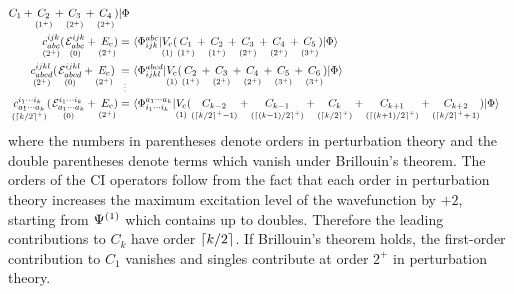 \documentclass[11pt]{article}
\numberwithin{equation}{section}
\begin{document}
\begin{rmk}
\begin{align}
{{      C_1
    }
    +
    \underset{(1^+)}{\vphantom{(}
      C_2
    }
    +
    \underset{(2^+)}{\vphantom{(}
      C_3
    }
    +
    \underset{(2^+)}{\vphantom{(}
      C_4
    }
    )
  |\ensuremath{\Phi }}
\\
  \underset{(2^+)}{\vphantom{(}
  c_{abc}^{ijk}
  }
  (\hspace{1pt}
  \underset{(0)}{\vphantom{(}
    \mathcal{E}_{abc}^{ijk}
  }
  +
  \underset{(2^+)}{\vphantom{(}
    E_{\mathrm{c}}
  }
  \hspace{-2pt}
  )
=&\
  \langle\Phi _{ijk}^{abc}|
  \underset{(1)}{\vphantom{(}
    V_{\mathrm{c}}
  }
    (
    \underset{(1^+)}{\vphantom{(}
      C_1
    }
    +
    \underset{(1^+)}{\vphantom{(}
      C_2
    }
    +
    \underset{(2^+)}{\vphantom{(}
      C_3
    }
    +
    \underset{(2^+)}{\vphantom{(}
      C_4
    }
    +
    \underset{(3^+)}{\vphantom{(}
      C_5
    }
    )
  |\Phi \rangle
\\
  \underset{(2^+)}{\vphantom{(}
  c_{abcd}^{ijkl}
  }
  (\hspace{1pt}
  \underset{(0)}{\vphantom{(}
    \mathcal{E}_{abcd}^{ijkl}
  }
  +
  \underset{(2^+)}{\vphantom{(}
    E_{\mathrm{c}}
  }
  \hspace{-2pt}
  )
\underset{\hspace{2pt}\vdots}{\vphantom{(}
=
}&\
  \langle\Phi _{ijkl}^{abcd}|
  \underset{(1)}{\vphantom{(}
    V_{\mathrm{c}}
  }
    (
    \underset{(1^+)}{\vphantom{(}
      C_2
    }
    +
    \underset{(2^+)}{\vphantom{(}
      C_3
    }
    +
    \underset{(2^+)}{\vphantom{(}
      C_4
    }
    +
    \underset{(3^+)}{\vphantom{(}
      C_5
    }
    +
    \underset{(3^+)}{\vphantom{(}
      C_6
    }
    )
  |\Phi \rangle
\\
\label{eq:ci-k-tuples-equation}
  \underset{(\left\lceil k/2\right\rceil^+)}{\vphantom{(}
  c_{a_1\cdots a_k}^{i_1\cdots i_k}
  }
  (\hspace{1pt}
  \underset{(0)}{\vphantom{(}
    \mathcal{E}_{a_1\cdots a_k}^{i_1\cdots i_k}
  }
  +
  \underset{(2^+)}{\vphantom{(}
    E_{\mathrm{c}}
  }
  \hspace{-2pt}
  )
=&\
  \langle\Phi _{i_1\cdots i_k}^{a_1\cdots a_k}|
  \underset{(1)}{\vphantom{(}
    V_{\mathrm{c}}
  }
    (
    \underset{(\left\lceil k/2\right\rceil^+-1)}{\vphantom{(}
      C_{k-2}
    }
    +
    \underset{(\left\lceil(k-1)/2\right\rceil^+)}{\vphantom{(}
      C_{k-1}
    }
    +
    \underset{(\left\lceil k/2\right\rceil^+)}{\vphantom{(}
      C_k
    }
    +
    \underset{(\left\lceil(k+1)/2\right\rceil^+)}{\vphantom{(}
      C_{k+1}
    }
    +
    \underset{(\left\lceil k/2\right\rceil^++\,1)}{\vphantom{(}
      C_{k+2}
    }
    )
  |\Phi \rangle
\end{align}
where the numbers in parentheses denote orders in perturbation theory and the double parentheses denote terms which vanish under Brillouin's theorem.
The orders of the CI operators follow from the fact that each order in perturbation theory increases the maximum excitation level of the wavefunction by $+2$, starting from $\Psi ^{(1)}$ which contains up to doubles.
Therefore the leading contributions to $C_k$ have order $\left\lceil k/2\right\rceil$.
If Brillouin's theorem holds, the first-order contribution to $C_1$ vanishes and singles contribute at order $2^+$ in perturbation theory.
\end{rmk}
\end{document}
